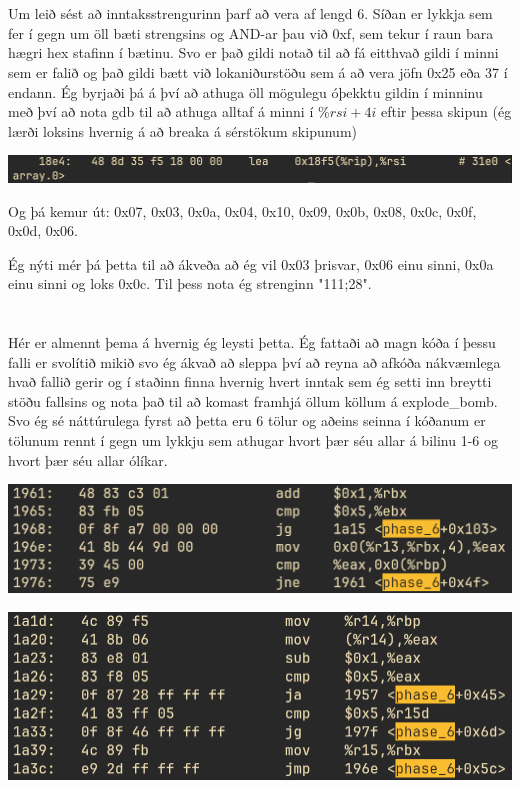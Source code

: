 \documentclass{article}
\begin{document}
	\section{}
	Um leið sést að inntaksstrengurinn þarf að vera af lengd $6$. Síðan er 
	lykkja sem fer í gegn um öll bæti strengsins og AND-ar þau við 0xf, sem 
	tekur í raun bara hægri hex stafinn í bætinu. Svo er það gildi notað 
	til að fá eitthvað gildi í minni sem er falið og það gildi bætt við 
	lokaniðurstöðu sem á að vera jöfn 0x25 eða 37 í endann. Ég byrjaði þá 
	á því að athuga öll mögulegu óþekktu gildin í minninu með því að nota 
	gdb til að athuga alltaf á minni í $\%rsi + 4i$ eftir þessa skipun 
	(ég lærði loksins hvernig á að breaka á sérstökum skipunum)
	\begin{center}
		\includegraphics[scale=0.35]{rsi.png}
	\end{center}
	Og þá kemur út: 0x07, 0x03, 0x0a, 0x04, 0x10, 0x09, 0x0b, 0x08, 0x0c, 
	0x0f, 0x0d, 0x06.

	Ég nýti mér þá þetta til að ákveða að ég vil 0x03 þrisvar, 0x06 einu 
	sinni, 0x0a einu sinni og loks 0x0c. Til þess nota ég strenginn 
	"111;28".

	\section{}

	Hér er almennt þema á hvernig ég leysti þetta. Ég fattaði að magn kóða í 
	þessu falli er svolítið mikið svo ég ákvað að sleppa því að reyna að 
	afkóða nákvæmlega hvað fallið gerir og í staðinn finna hvernig hvert 
	inntak sem ég setti inn breytti stöðu fallsins og nota það til að 
	komast framhjá öllum köllum á explode\_bomb. Svo ég sé náttúrulega 
	fyrst að þetta eru 6 tölur og aðeins seinna í kóðanum er tölunum 
	rennt í gegn um lykkju sem athugar hvort þær séu allar á bilinu 1-6 og 
	hvort þær séu allar ólíkar.
	\begin{center}
		\includegraphics[scale=0.35]{1961.png}
	\end{center}
	\begin{center}
		\includegraphics[scale=0.35]{1a1d.png}
	\end{center}
\end{document}

